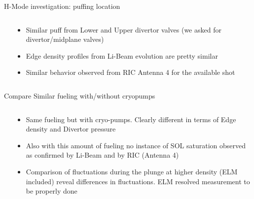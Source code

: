 \documentclass[10pt, compress]{beamer}
\newcommand\Fontvi{\fontsize{8}{7.2}\selectfont}
\begin{document}
\begin{frame}{H-Mode investigation: puffing location}
\Fontvi
  \vspace{-1cm}
\begin{columns}
  \begin{column}{0.65\textwidth}
  \end{column}
  \begin{column}{0.35\textwidth}
    \begin{itemize}
      \item Similar puff from Lower and Upper divertor valves
        (\alert{we asked for divertor/midplane valves})
      \item<2-> Edge density profiles from Li-Beam evolution are
        pretty similar
      \item<3|alert@3> Similar behavior observed from RIC Antenna 4
        for the available shot
    \end{itemize}
  \end{column}
\end{columns}
\end{frame}


\begin{frame}{Compare Similar fueling with/without cryopumps}
\Fontvi
  \vspace{-1cm}
\begin{columns}
  \begin{column}{0.65\textwidth}
  \end{column}
  \begin{column}{0.35\textwidth}
    \begin{itemize}
      \item<1-> Same fueling but with cryo-pumps. Clearly different in
        terms of Edge density and Divertor pressure
      \item<2-> Also with this amount of fueling no instance of SOL
        saturation observed as confirmed by Li-Beam and by RIC (Antenna 4)
      \item<3> Comparison of fluctuations during the plunge at higher
        density (\alert{ELM included}) reveal differences in
        fluctuations. \alert{ELM resolved measurement to be properly done}  
        
    \end{itemize}
  \end{column}
\end{columns}
\end{frame}
\end{document}
